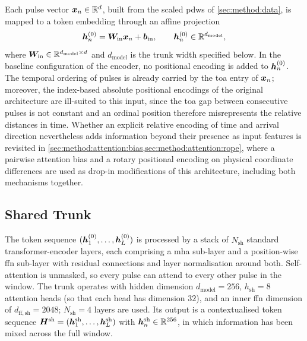 Each pulse vector $\bm{x}_n \in \mathbb{R}^{d}$, built from the scaled \glspl{pdw} of \cref{sec:method:data}, is mapped to a token embedding through an affine projection
\begin{equation}\label{eq:method:input_embed}
  \bm{h}^{(0)}_n = \bm{W}_{\mathrm{in}}\bm{x}_n + \bm{b}_{\mathrm{in}},
  \qquad
  \bm{h}^{(0)}_n \in \mathbb{R}^{d_{\mathrm{model}}},
\end{equation}
where $\bm{W}_{\mathrm{in}} \in \mathbb{R}^{d_{\mathrm{model}} \times d}$ and $d_{\mathrm{model}}$ is the trunk width specified below.
In the baseline configuration of the encoder, no positional encoding is added to $\bm{h}^{(0)}_n$.
The temporal ordering of pulses is already carried by the \gls{toa} entry of $\bm{x}_n$; moreover, the index-based absolute positional encodings of the original architecture \parencite{vaswani2017attention} are ill-suited to this input, since the \gls{toa} gap between consecutive pulses is not constant and an ordinal position therefore misrepresents the relative distances in time.
Whether an explicit relative encoding of time and arrival direction nevertheless adds information beyond their presence as input features is revisited in \cref{sec:method:attention:bias,sec:method:attention:rope}, where a pairwise attention bias and a rotary positional encoding on physical coordinate differences are used as drop-in modifications of this architecture, including both mechanisms together.

\subsection*{Shared Trunk}

The token sequence $(\bm{h}^{(0)}_1,\ldots,\bm{h}^{(0)}_L)$ is processed by a stack of $N_{\mathrm{sh}}$ standard transformer-encoder layers, each comprising a \gls{mha} sub-layer and a position-wise \gls{ffn} sub-layer with residual connections and layer normalisation around both.
Self-attention is unmasked, so every pulse can attend to every other pulse in the window.
The trunk operates with hidden dimension $d_{\mathrm{model}} = 256$, $h_{\mathrm{sh}} = 8$ attention heads (so that each head has dimension $32$), and an inner \gls{ffn} dimension of $d_{\mathrm{ff,sh}} = 2048$; $N_{\mathrm{sh}} = 4$ layers are used.
Its output is a contextualised token sequence $\bm{H}^{\mathrm{sh}} = (\bm{h}^{\mathrm{sh}}_1,\ldots,\bm{h}^{\mathrm{sh}}_L)$ with $\bm{h}^{\mathrm{sh}}_n \in \mathbb{R}^{256}$, in which information has been mixed across the full window.

